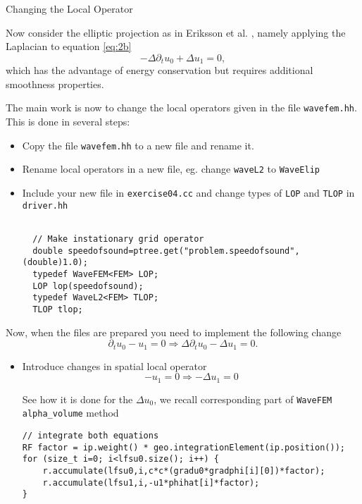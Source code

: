 \documentclass[12pt,a4paper]{article}
\begin{document}
\begin{Exercise}{Changing the Local Operator}

Now consider the elliptic projection as in Eriksson et al. \cite{Eriksson}, namely applying the Laplacian to equation \eqref{eq:2b}
\begin{equation}\label{eq:elip}
-\Delta \partial_t u_0 + \Delta u_1 = 0,
\end{equation}
which has the advantage of  energy conservation but requires additional smoothness properties.


The main work is now to change the local operators given in the
  file \lstinline{wavefem.hh}. This is done in several steps:
  \begin{itemize}
  \item Copy the file \lstinline{wavefem.hh} to a new file and rename it.
  \item Rename local operators in a new file, eg. change \lstinline{waveL2} to \lstinline{WaveElip}
  \item Include your new file in \lstinline{exercise04.cc} and change types of \lstinline{LOP} and \lstinline{TLOP} in \lstinline{driver.hh}
  \begin{lstlisting}

  // Make instationary grid operator
  double speedofsound=ptree.get("problem.speedofsound",(double)1.0);
  typedef WaveFEM<FEM> LOP;
  LOP lop(speedofsound);
  typedef WaveL2<FEM> TLOP;
  TLOP tlop;  
  \end{lstlisting}
\end{itemize}

Now, when the files are prepared you need to implement the following change 
$$ \partial_t u_0 - u_1 = 0 \Rightarrow \Delta \partial_t u_0 - \Delta u_1 = 0.$$

\begin{itemize}

\item Introduce changes in spatial local operator 
$$ - u_1 = 0 \Rightarrow -  \Delta u_1 = 0$$

See how it is done for the $\Delta u_0$, we recall corresponding part of \lstinline{WaveFEM} \lstinline{alpha_volume} method
  \begin{lstlisting}
// integrate both equations
RF factor = ip.weight() * geo.integrationElement(ip.position());
for (size_t i=0; i<lfsu0.size(); i++) {
	r.accumulate(lfsu0,i,c*c*(gradu0*gradphi[i][0])*factor);
	r.accumulate(lfsu1,i,-u1*phihat[i]*factor);
}
  \end{lstlisting}



\end{itemize}
\end{Exercise}
\end{document}
